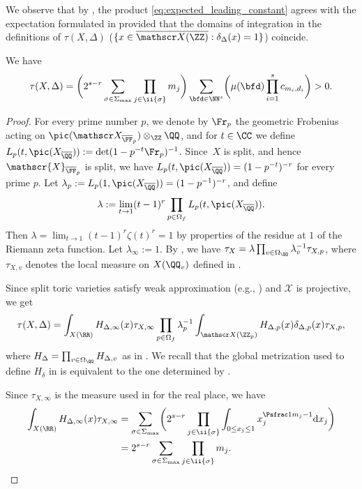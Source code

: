 We observe that by \cite[Prop.\,2.4.4]{MR1369408},
the product \eqref{eq:expected_leading_constant} agrees with the expectation formulated
in \cite[\S3.3]{PSTVA} provided that the domains of integration in the definitions of
$\tau(X,\Delta)$ (\ie $\{x\in \overline {\mathscr X(\ZZ)} : \delta_{\Delta}(x)=1\}$) coincide.

\begin{prop}
\label{prop:constant}
We have\vspace*{-3pt}
\[
\tau(X,\Delta)=\biggl(2^{s-r}\sum_{\sigma\in\Sigma_{\max}}\prod_{j\in\ii{\sigma}} m_j\biggr)
\sum_{\bfd\in\NN^s}\biggr(\mu(\bfd) \prod_{i=1}^sc_{m_i,d_i} \biggr)>0.
\]
\end{prop}
\begin{proof}
For every prime number $p$, we denote by $\Fr_p$ the geometric Frobenius acting
on $\pic(\mathscr X_{\overline{\FF}_p})\otimes_\ZZ\QQ$, and for $t\in\CC$
we define $L_p(t,\pic(X_{\overline \QQ})):=\det(1-p^{-t} \Fr_p)^{-1}$.
Since~$X$ is split, and hence $\mathscr{X}_{\overline{\FF}_p}$ is split,
we have $L_p(t,\pic(X_{\overline \QQ}))=(1-p^{-t})^{-r}$ for every prime $p$.
Let $\lambda_p:=L_p(1,\pic(X_{\overline \QQ}))=(1-p^{-1})^{-r}$,
and define\vspace*{-3pt}
\[
\lambda:=\lim_{t\to 1}(t-1)^{r}\prod_{p\in\Omega_f}L_p(t,\pic(X_{\overline \QQ})).
\]
Then $\lambda=\lim_{t\to 1}(t-1)^{r}\zeta(t)^r=1$ by properties of the residue at $1$
of the Riemann zeta function. Let $\lambda_{\infty}:=1$.
By \cite[Rem.\,2.9(b)]{MR2740045}, we have
$\tau_X=\lambda \prod_{v\in\Omega_\QQ}\lambda_v^{-1}\tau_{X,p}$, where $\tau_{X,v}$
denotes the local measure on $X(\QQ_v)$ defined in \cite[\S2.1.7]{MR2740045}.

Since split toric varieties satisfy weak approximation (e.g., \cite[\S2]{MR2029861})
and $\mathscr X$ is projective, we get\vspace*{-3pt}
\[
\tau(X,\Delta)=\int_{X(\RR)}H_{\Delta, \infty}(x)\tau_{X,\infty}
\prod_{p \in \Omega_f}\lambda_p^{-1}
\int_{ {\mathscr X(\ZZ_p)}}H_{\Delta,p}(x)\delta_{\Delta,p} (x) \tau_{X,p},
\]
where
$H_\Delta=\prod_{v\in\Omega_\QQ} H_{\Delta,v}$ as in \cite[\S2.1]{MR1369408}.
We recall that the global metrization used to define $H_\delta$ in \cite[\S2.1]{MR1369408}
is equivalent to the one determined by \cite[Prop.\,\& Def.\,9.2]{MR1679841}.

Since $\tau_{X,\infty}$ is the measure used in \cite[Prop.\,9.16]{MR1679841} for the real place,
we have\vspace*{-3pt}
\begin{align*}
\int_{X(\RR)}H_{\Delta, \infty}(x)\tau_{X,\infty}
&=\sum_{\sigma\in\Sigma_{\max}}\biggl(2^{s-r}\prod_{j \in \ii{\sigma}}
\int_{0\leq x_j\leq 1}x_j^{\Psfrac 1{m_j}-1}\mathrm d x_j\biggr)\\
&=2^{s-r}\sum_{\sigma\in\Sigma_{\max}}\prod_{j\in \ii{\sigma}} m_j.
\end{align*}


\end{proof}
